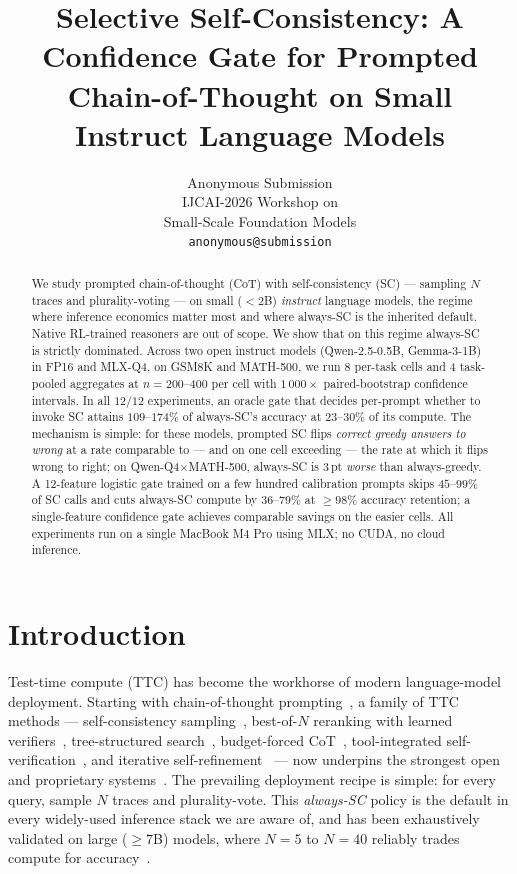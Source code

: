 \documentclass[11pt]{article}
\title{Selective Self-Consistency: A Confidence Gate for Prompted Chain-of-Thought on Small Instruct Language Models}
\author{Anonymous Submission \\
  IJCAI-2026 Workshop on \\
  Small-Scale Foundation Models \\
  \texttt{anonymous@submission} \\}
\begin{document}
\maketitle

\begin{abstract}
We study prompted chain-of-thought (CoT) with self-consistency
(SC) --- sampling $N$ traces and plurality-voting --- on
small ($<2$B) \emph{instruct} language models, the regime where
inference economics matter most and where always-SC is the
inherited default. Native RL-trained reasoners are out of scope.
We show that on this regime always-SC is strictly dominated.
Across two open instruct models (Qwen-2.5-0.5B, Gemma-3-1B) in
FP16 and MLX-Q4, on GSM8K and MATH-500, we run 8 per-task cells
and 4 task-pooled aggregates at $n{=}200$--$400$ per cell with
$1\,000{\times}$ paired-bootstrap confidence intervals. In all
$12/12$ experiments, an oracle gate that decides per-prompt whether
to invoke SC attains $109$--$174\%$ of always-SC's accuracy at
$23$--$30\%$ of its compute. The mechanism is simple: for these
models, prompted SC flips \emph{correct greedy answers to wrong}
at a rate comparable to --- and on one cell exceeding --- the rate
at which it flips wrong to right; on Qwen-Q4${\times}$MATH-500,
always-SC is $3$\,pt \emph{worse} than always-greedy. A 12-feature
logistic gate trained on a few hundred calibration prompts skips
$45$--$99\%$ of SC calls and cuts always-SC compute by $36$--$79\%$
at $\ge 98\%$ accuracy retention; a single-feature confidence gate
achieves comparable savings on the easier cells. All experiments
run on a single MacBook M4 Pro using MLX; no CUDA, no cloud
inference.
\end{abstract}

\section{Introduction}

Test-time compute (TTC) has become the workhorse of modern
language-model deployment. Starting with chain-of-thought
prompting~\citep{Wei2022CoT,Kojima2022ZeroShotCoT}, a family of TTC
methods --- self-consistency sampling~\citep{Wang2023SC}, best-of-$N$
reranking with learned verifiers~\citep{Cobbe2021Verifiers,
Lightman2023LetsVerify}, tree-structured
search~\citep{Yao2023ToT}, budget-forced CoT~\citep{Snell2024TTC},
tool-integrated self-verification~\citep{Kang2025T1}, and iterative
self-refinement~\citep{Madaan2023SelfRefine} --- now underpins the
strongest open and proprietary
systems~\citep{DeepSeekR1,OpenAIO1,Chen2025LongCoTSurvey}. The
prevailing deployment recipe is simple: for every query, sample $N$
traces and plurality-vote. This \emph{always-SC} policy is the
default in every widely-used inference stack we are
aware of, and has been exhaustively validated on large
($\ge 7$B) models, where $N{=}5$ to $N{=}40$ reliably trades compute
for accuracy~\citep{Chen2025LongCoTSurvey,Snell2024TTC}.
\end{document}
